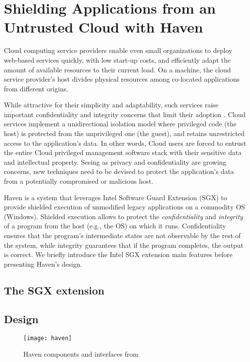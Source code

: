 \section{Shielding Applications from an Untrusted Cloud with Haven}

Cloud computing service providers enable even small organizations to deploy web-based services quickly, with low start-up costs, and efficiently adapt the amount of available resources to their current load.
On a machine, the cloud service provider's host divides physical resources among co-located applications from different origins.

While attractive for their simplicity and adaptability, such services raise important confidentiality and integrity concerns that limit their adoption \cite{mining,NSAYahoo}.
Cloud services implement a unidirectional isolation model where privileged code (the host) is protected from the unprivileged one (the guest), and retains unrestricted access to the application's data.
In other words, Cloud users are forced to entrust the entire Cloud privileged management software stack with their sensitive data and intellectual property.
Seeing as privacy and confidentiality are growing concerns, new techniques need to be devised to protect the application's data from a potentially compromised or malicious host.

Haven \cite{DBLP:journals/tocs/BaumannPH15} is a system that leverages Intel Software Guard Extension (SGX) \cite{SGXManual} to provide shielded execution of unmodified legacy applications on a commodity OS (Windows).
Shielded execution allows to protect the \emph{confidentiality} and \emph{integrity} of a program from the host (e.g., the OS) on which it runs.
Confidentiality ensures that the program's intermediate states are not observable by the rest of the system, while integrity guarantees that if the program completes, the output is correct.
We briefly introduce the Intel SGX extension main features before presenting Haven's design.

\subsection{The SGX extension}



\subsection{Design}

\begin{figure*}
	\centering
	\captionsetup{justification=centering}
  	\texttt{[image: haven]}
  	\caption{Haven components and interfaces from \cite{DBLP:journals/tocs/BaumannPH15}}
  	\label{stackOfHaven}
\end{figure*}

